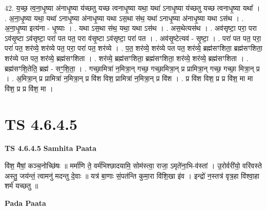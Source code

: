 \documentclass[17pt]{extarticle}
\begin{document}
42. य॒च्छ॒ त्व॒ना॒धृ॒ष्या अ॑नाधृ॒ष्या य॑च्छतु यच्छ त्वनाधृ॒ष्या यथा॒ यथा॑ ऽनाधृ॒ष्या य॑च्छतु यच्छ त्वनाधृ॒ष्या यथा᳚ । . अ॒ना॒धृ॒ष्या यथा॒ यथा॑ ऽनाधृ॒ष्या अ॑नाधृ॒ष्या यथा ऽस॒था स॑थ॒ यथा॑ ऽनाधृ॒ष्या अ॑नाधृ॒ष्या यथा ऽस॑थ । . अ॒ना॒धृ॒ष्या इत्य॑ना - धृ॒ष्याः । . यथा ऽस॒था स॑थ॒ यथा॒ यथा ऽस॑थ । . अस॒थेत्यस॑थ । . अव॑सृष्टा॒ परा॒ परा ऽव॑सृ॒ष्टा ऽव॑सृष्टा॒ परा॑ पत पत॒ परा व॑सृ॒ष्टा ऽव॑सृष्टा॒ परा॑ पत । . अव॑सृ॒ष्टेत्यव॑ - सृ॒ष्टा॒ । . परा॑ पत पत॒ परा॒ परा॑ पत॒ शर॑व्ये॒ शर॑व्ये पत॒ परा॒ परा॑ पत॒ शर॑व्ये । . प॒त॒ शर॑व्ये॒ शर॑व्ये पत पत॒ शर॑व्ये॒ ब्रह्म॑सꣳशिता॒ ब्रह्म॑सꣳशिता॒ शर॑व्ये पत पत॒ शर॑व्ये॒ ब्रह्म॑सꣳशिता । . शर॑व्ये॒ ब्रह्म॑सꣳशिता॒ ब्रह्म॑सꣳशिता॒ शर॑व्ये॒ शर॑व्ये॒ ब्रह्म॑सꣳशिता । . ब्रह्म॑सꣳशि॒तेति॒ ब्रह्म॑ - सꣳ॒॒शि॒ता॒ । . गच्छा॒मित्रा॑ न॒मित्रा॒न् गच्छ॒ गच्छा॒मित्रा॒न् प्र प्रामित्रा॒न् गच्छ॒ गच्छा॒ मित्रा॒न् प्र । . अ॒मित्रा॒न् प्र प्रामित्रा॑ न॒मित्रा॒न् प्र वि॑श विश॒ प्रामित्रा॑ न॒मित्रा॒न् प्र वि॑श । . प्र वि॑श विश॒ प्र प्र वि॑श॒ मा मा वि॑श॒ प्र प्र वि॑श॒ मा । \newline
\pagebreak
{}

\section{ TS 4.6.4.5 }

\textbf{TS 4.6.4.5 } \newline
\textbf{Samhita Paata} \newline

वि॑श॒ मैषां॒ कञ्च॒नोच्छि॑षः ॥ मर्मा॑णि ते॒ वर्म॑भिश्छादयामि॒ सोम॑स्त्वा॒ राजा॒ ऽमृते॑ना॒भि-व॑स्तां । उ॒रोर्वरी॑यो॒ वरि॑वस्ते अस्तु॒ जय॑न्तं॒ त्वामनु॑ मदन्तु दे॒वाः ॥ यत्र॑ बा॒णाः सं॒पत॑न्ति कुमा॒रा वि॑शि॒खा इ॑व । इन्द्रो॑ न॒स्तत्र॑ वृत्र॒हा वि॑श्वा॒हा शर्म॑ यच्छतु ॥ \newline

\textbf{Pada Paata} \newline
\end{document}
